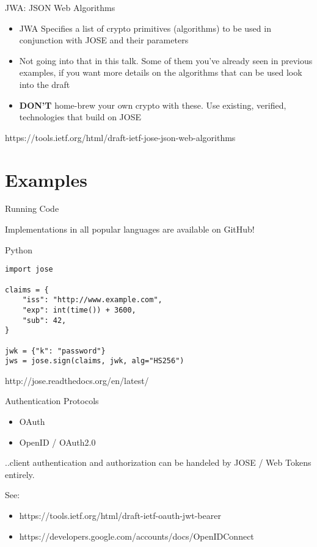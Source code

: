 \begin{frame}{JWA: JSON Web Algorithms}

\begin{itemize}
\item
  JWA Specifies a list of crypto primitives (algorithms) to be used in
  conjunction with JOSE and their parameters
\item
  Not going into that in this talk. Some of them you've already seen in
  previous examples, if you want more details on the algorithms that can
  be used look into the draft
\item
  \textbf{DON'T} home-brew your own crypto with these. Use existing,
  verified, technologies that build on JOSE
\end{itemize}

https://tools.ietf.org/html/draft-ietf-jose-json-web-algorithms

\end{frame}

\section{Examples}\label{examples}

\begin{frame}[fragile]{Running Code}

Implementations in all popular languages are available on GitHub!

\begin{block}{Python}

\small

\begin{verbatim}
import jose

claims = {
    "iss": "http://www.example.com",
    "exp": int(time()) + 3600,
    "sub": 42,
}

jwk = {"k": "password"}
jws = jose.sign(claims, jwk, alg="HS256")
\end{verbatim}

http://jose.readthedocs.org/en/latest/

\end{block}

\end{frame}

\begin{frame}{Authentication Protocols}

\begin{itemize}
\itemsep1pt\parskip0pt
\item
  OAuth
\item
  OpenID / OAuth2.0
\end{itemize}

..client authentication and authorization can be handeled by JOSE / Web
Tokens entirely.

See:

\begin{itemize}
\itemsep1pt\parskip0pt
\item
  https://tools.ietf.org/html/draft-ietf-oauth-jwt-bearer
\item
  https://developers.google.com/accounts/docs/OpenIDConnect
\end{itemize}

\end{frame}

